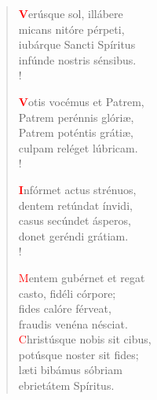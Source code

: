 \begin{verse}
\hspace{3.5cm} \textcolor{red}{\bf V}erúsque sol, illábere\\
\hspace{3.5cm} micans nitóre pérpeti, \\
\hspace{3.5cm} iubárque Sancti Spíritus\\
\hspace{3.5cm} infúnde nostris sénsibus.\\!

\hspace{3.5cm} \textcolor{red}{\bf V}otis vocémus et Patrem,\\
\hspace{3.5cm} Patrem perénnis glóriæ, \\
\hspace{3.5cm} Patrem poténtis grátiæ,\\
\hspace{3.5cm} culpam reléget lúbricam.\\!

\hspace{3.5cm} \textcolor{red}{\bf I}nfórmet actus strénuos, \\
\hspace{3.5cm} dentem retúndat ínvidi, \\
\hspace{3.5cm} casus secúndet ásperos,\\
\hspace{3.5cm} donet geréndi grátiam.\\!

\hspace{3.5cm} \textcolor{red}{M}entem gubérnet et regat \\
\hspace{3.5cm} casto, fidéli córpore; \\
\hspace{3.5cm} fides calóre férveat,\\
\hspace{3.5cm} fraudis venéna nésciat.\\

\hspace{3.5cm} \textcolor{red}{C}hristúsque nobis sit cibus, \\
\hspace{3.5cm} potúsque noster sit fides; \\
\hspace{3.5cm} læti bibámus sóbriam\\
\hspace{3.5cm} ebrietátem Spíritus.\\


\end{verse}
